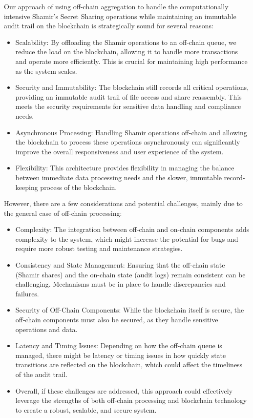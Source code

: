 \documentclass{tufte-handout}
\begin{document}
Our approach of using off-chain aggregation to handle the computationally intensive Shamir's Secret Sharing operations while maintaining an immutable audit trail on
the blockchain is strategically sound for several reasons:
\begin{itemize}
\item Scalability: By offloading the Shamir operations to an off-chain queue, we reduce the load on the blockchain, allowing it to handle more transactions and operate
more efficiently. This is crucial for maintaining high performance as the system scales.
\item Security and Immutability: The blockchain still records all critical operations, providing an immutable audit trail of file access and share reassembly. This meets
the security requirements for sensitive data handling and compliance needs.
\item Asynchronous Processing: Handling Shamir operations off-chain and allowing the blockchain to process these operations asynchronously can significantly improve the
overall responsiveness and user experience of the system.
\item Flexibility: This architecture provides flexibility in managing the balance between immediate data processing needs and the slower, immutable record-keeping process
of the blockchain.
\end{itemize}
However, there are a few considerations and potential challenges, mainly due to the general case of off-chain processing:
\begin{itemize}
\item Complexity: The integration between off-chain and on-chain components adds complexity to the system, which might increase the potential for bugs and require more
robust testing and maintenance strategies.
\item Consistency and State Management: Ensuring that the off-chain state (Shamir shares) and the on-chain state (audit logs) remain consistent can be challenging.
Mechanisms must be in place to handle discrepancies and failures.
\item Security of Off-Chain Components: While the blockchain itself is secure, the off-chain components must also be secured, as they handle sensitive operations and data.
\item Latency and Timing Issues: Depending on how the off-chain queue is managed, there might be latency or timing issues in how quickly state transitions are reflected
on the blockchain, which could affect the timeliness of the audit trail.
\item Overall, if these challenges are addressed, this approach could effectively leverage the strengths of both off-chain processing and blockchain technology to
create a robust, scalable, and secure system.
\end{itemize}
\end{document}
